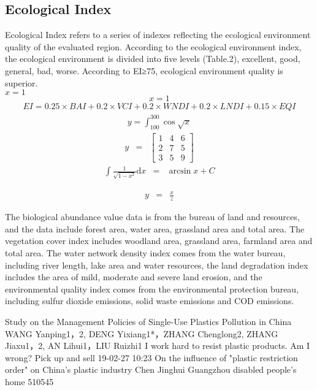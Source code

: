 \documentclass[12pt]{article}
\begin{document}
\subsection{Ecological Index}
Ecological Index refers to a series of indexes reflecting the ecological environment quality of the evaluated region. According to the ecological environment index, the ecological environment is divided into five levels (Table.2), excellent, good, general, bad, worse. According to EI≥75, ecological environment quality is superior.\\
$x=1$
$$x=1$$
\begin{eqnarray}
EI=0.25\times BAI+  0.2\times VCI +0.2\times WNDI+0.2\times LNDI+0.15\times EQI
\end{eqnarray}
\begin{eqnarray}
y=\int_{100}^{300} \cos \sqrt{x} 
\end{eqnarray}
\begin{eqnarray}
y & = & \begin{bmatrix}
  1  &4  &6 \\
  2  &7&5 \\
  3 & 5&  9
\end{bmatrix}
\end{eqnarray}
\begin{eqnarray}
\int \frac{1}{\sqrt{1-x^{2}}}\mathrm{d}x & = & \arcsin x +C 
\end{eqnarray}

\begin{eqnarray}
y & = & \frac{x}{z} 
\end{eqnarray}

The biological abundance value data is from the bureau of land and resources, and the data include forest area, water area, grassland area and total area. The vegetation cover index includes woodland area, grassland area, farmland area and total area. The water network density index comes from the water bureau, including river length, lake area and water resources, the land degradation index includes the area of mild, moderate and severe land erosion, and the environmental quality index comes from the environmental protection bureau, including sulfur dioxide emissions, solid waste emissions and COD emissions.

\begin{thebibliography}{99}
 Study on the Management Policies of Single-Use Plastics Pollution in China WANG Yanping1，2, DENG Yixiang1*，ZHANG Chenglong2, ZHANG Jiaxu1，2, AN Lihui1，LIU Ruizhi1
I work hard to resist plastic products. Am I wrong? Pick up and sell 19-02-27 10:23
On the influence of "plastic restriction order" on China's plastic industry            Chen Jinghui Guangzhou disabled people's home 510545
\end{thebibliography}
\end{document}
